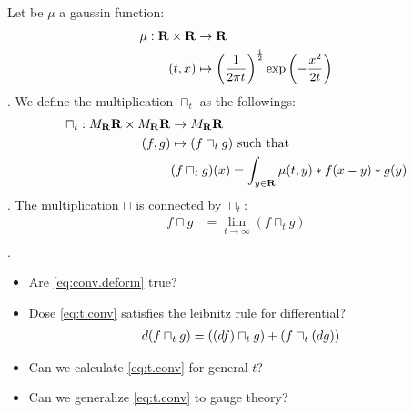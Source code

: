 \begin{observe}
Let be $\mu$ a gaussin function:
\begin{equation}\begin{split}
	\mu:{\mathbf{R}}\times{\mathbf{R}} &\to {\mathbf{R}} \\
		(t,x) &\mapsto \left({\frac{1}{2 \pi t}}\right)^{\frac{1}{2}}\exp\left({-\frac{x^2}{2t}}\right) \\
\end{split}\end{equation}
. We define the multiplication $\sqcap_t$ as the followings:
\begin{equation}\begin{split}\label{eq:t.conv}
	\sqcap_t: M_{{\mathbf{R}}}{\mathbf{R}}\times M_{{\mathbf{R}}}{\mathbf{R}} &\to M_{{\mathbf{R}}}{\mathbf{R}} \\
	(f,g) &\mapsto (f\sqcap_t g) \text{ such that} \\
	& (f\sqcap_tg)(x) = \int_{y\in{\mathbf{R}}}\mu(t,y)*f(x-y)*g(y) \\
\end{split}\end{equation}
. The multiplication $\sqcap$ is connected by $\sqcap_t$:
\begin{equation}\begin{split}\label{eq:conv.deform}
	f\sqcap g &= \lim_{t\to\infty}(f\sqcap_tg) \\
\end{split}\end{equation}
.
\begin{itemize}
\item Are \eqref{eq:conv.deform} true?
\item Dose \eqref{eq:t.conv} satisfies the leibnitz rule for differential?
\begin{equation}\begin{split}
	d(f\sqcap_tg) &= \left({\left({df}\right)\sqcap_tg}\right)+\left({f\sqcap_t\left({dg}\right)}\right)
\end{split}\end{equation}
\item Can we calculate \eqref{eq:t.conv} for general $t$?
\item Can we generalize \eqref{eq:t.conv} to gauge theory?
\end{itemize}
\end{observe}

